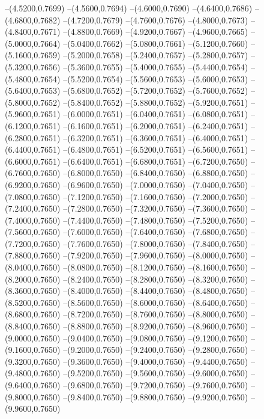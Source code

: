 {	--(4.5200,0.7699)
	--(4.5600,0.7694)
	--(4.6000,0.7690)
	--(4.6400,0.7686)
	--(4.6800,0.7682)
	--(4.7200,0.7679)
	--(4.7600,0.7676)
	--(4.8000,0.7673)
	--(4.8400,0.7671)
	--(4.8800,0.7669)
	--(4.9200,0.7667)
	--(4.9600,0.7665)
	--(5.0000,0.7664)
	--(5.0400,0.7662)
	--(5.0800,0.7661)
	--(5.1200,0.7660)
	--(5.1600,0.7659)
	--(5.2000,0.7658)
	--(5.2400,0.7657)
	--(5.2800,0.7657)
	--(5.3200,0.7656)
	--(5.3600,0.7655)
	--(5.4000,0.7655)
	--(5.4400,0.7654)
	--(5.4800,0.7654)
	--(5.5200,0.7654)
	--(5.5600,0.7653)
	--(5.6000,0.7653)
	--(5.6400,0.7653)
	--(5.6800,0.7652)
	--(5.7200,0.7652)
	--(5.7600,0.7652)
	--(5.8000,0.7652)
	--(5.8400,0.7652)
	--(5.8800,0.7652)
	--(5.9200,0.7651)
	--(5.9600,0.7651)
	--(6.0000,0.7651)
	--(6.0400,0.7651)
	--(6.0800,0.7651)
	--(6.1200,0.7651)
	--(6.1600,0.7651)
	--(6.2000,0.7651)
	--(6.2400,0.7651)
	--(6.2800,0.7651)
	--(6.3200,0.7651)
	--(6.3600,0.7651)
	--(6.4000,0.7651)
	--(6.4400,0.7651)
	--(6.4800,0.7651)
	--(6.5200,0.7651)
	--(6.5600,0.7651)
	--(6.6000,0.7651)
	--(6.6400,0.7651)
	--(6.6800,0.7651)
	--(6.7200,0.7650)
	--(6.7600,0.7650)
	--(6.8000,0.7650)
	--(6.8400,0.7650)
	--(6.8800,0.7650)
	--(6.9200,0.7650)
	--(6.9600,0.7650)
	--(7.0000,0.7650)
	--(7.0400,0.7650)
	--(7.0800,0.7650)
	--(7.1200,0.7650)
	--(7.1600,0.7650)
	--(7.2000,0.7650)
	--(7.2400,0.7650)
	--(7.2800,0.7650)
	--(7.3200,0.7650)
	--(7.3600,0.7650)
	--(7.4000,0.7650)
	--(7.4400,0.7650)
	--(7.4800,0.7650)
	--(7.5200,0.7650)
	--(7.5600,0.7650)
	--(7.6000,0.7650)
	--(7.6400,0.7650)
	--(7.6800,0.7650)
	--(7.7200,0.7650)
	--(7.7600,0.7650)
	--(7.8000,0.7650)
	--(7.8400,0.7650)
	--(7.8800,0.7650)
	--(7.9200,0.7650)
	--(7.9600,0.7650)
	--(8.0000,0.7650)
	--(8.0400,0.7650)
	--(8.0800,0.7650)
	--(8.1200,0.7650)
	--(8.1600,0.7650)
	--(8.2000,0.7650)
	--(8.2400,0.7650)
	--(8.2800,0.7650)
	--(8.3200,0.7650)
	--(8.3600,0.7650)
	--(8.4000,0.7650)
	--(8.4400,0.7650)
	--(8.4800,0.7650)
	--(8.5200,0.7650)
	--(8.5600,0.7650)
	--(8.6000,0.7650)
	--(8.6400,0.7650)
	--(8.6800,0.7650)
	--(8.7200,0.7650)
	--(8.7600,0.7650)
	--(8.8000,0.7650)
	--(8.8400,0.7650)
	--(8.8800,0.7650)
	--(8.9200,0.7650)
	--(8.9600,0.7650)
	--(9.0000,0.7650)
	--(9.0400,0.7650)
	--(9.0800,0.7650)
	--(9.1200,0.7650)
	--(9.1600,0.7650)
	--(9.2000,0.7650)
	--(9.2400,0.7650)
	--(9.2800,0.7650)
	--(9.3200,0.7650)
	--(9.3600,0.7650)
	--(9.4000,0.7650)
	--(9.4400,0.7650)
	--(9.4800,0.7650)
	--(9.5200,0.7650)
	--(9.5600,0.7650)
	--(9.6000,0.7650)
	--(9.6400,0.7650)
	--(9.6800,0.7650)
	--(9.7200,0.7650)
	--(9.7600,0.7650)
	--(9.8000,0.7650)
	--(9.8400,0.7650)
	--(9.8800,0.7650)
	--(9.9200,0.7650)
	--(9.9600,0.7650)
}
